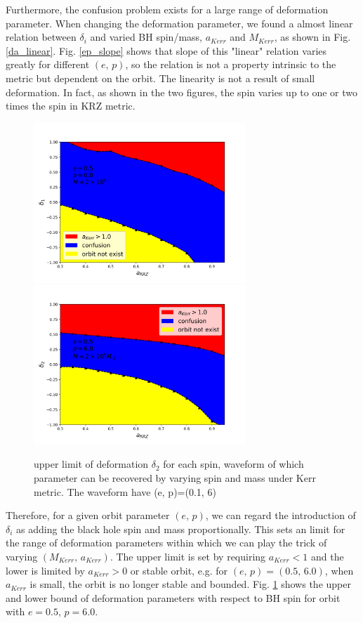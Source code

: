 \documentclass{article}
\begin{document}
Furthermore, the confusion problem exists for a large range of deformation parameter. When changing the deformation parameter, we found a almost linear relation between $\delta_i$ and varied BH spin/mass, $a_{Kerr}$ and $M_{Kerr}$, as shown in Fig. \ref{da_linear}. Fig. \ref{ep_slope} shows that slope of this "linear" relation varies greatly for different $(e,\,p)$, so the relation is not a property intrinsic to the metric but dependent on the orbit. The linearity is not a result of small deformation. In fact, as shown in the two figures, the spin varies up to one or two times the spin in KRZ metric. 

\begin{figure}[!htb]
	\centering
	\includegraphics[width=8cm]{2D_bound.png}
	\includegraphics[width=8cm]{2D_bound_d2.png}
	
	\caption{upper limit of deformation $\delta_2$ for each spin, waveform of which parameter can be recovered by varying spin and mass under Kerr metric. The waveform have (e, p)=(0.1, 6)}
	\label{d2limit}
\end{figure}

Therefore, for a given orbit parameter $(e,\, p)$, we can regard the introduction of $\delta_i$ as adding the black hole spin and mass proportionally. This sets an limit for the range of deformation parameters within which we can play the trick of varying $(M_{Kerr},\, a_{Kerr})$. The upper limit is set by requiring $a_{Kerr}<1$ and the lower is limited by $a_{Kerr}>0$ or stable orbit, e.g. for $(e,\, p)=(0.5,\, 6.0)$, when $a_{Kerr}$ is small, the orbit is no longer stable and bounded. Fig. \ref{d2limit} shows the upper and lower bound of deformation parameters with respect to BH spin for orbit with $e=0.5,\, p=6.0$. 
\end{document}
